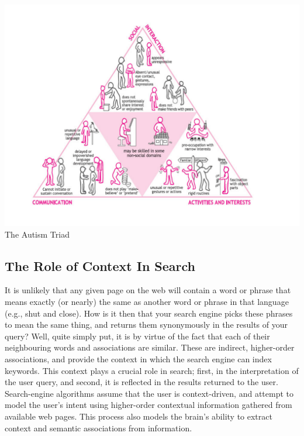 \documentclass[a4paper, 10pt]{article}
\begin{document}
\begin{center}
\includegraphics[scale=0.3]{asd}\\
The Autism Triad \cite{triad}
\end{center}

\subsection{The Role of Context In Search} \label{the problem}
It is unlikely that any given page on the web will contain a word or phrase that means exactly (or nearly) the same as another word or phrase in that language (e.g., shut and close). How is it then that your search engine picks these phrases to mean the same thing, and returns them synonymously in the results of your query? Well, quite simply put, it is by virtue of the fact that each of their neighbouring words and associations are similar. These are indirect, higher-order associations, and provide the context in which the search engine can index keywords. This context plays a crucial role in search; first, in the interpretation of the user query, and second, it is reflected in the results returned to the user.\\
Search-engine algorithms assume that the user is context-driven, and attempt to model the user's intent using higher-order contextual information gathered from available web pages. This process also models the brain's ability to extract context and semantic associations from information.\\
\end{document}
